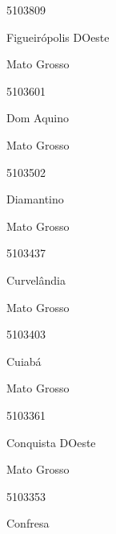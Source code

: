 \documentclass[
  letterpaper,
]{report}
\begin{document}
5103809

\n      

Figueirópolis D\textquotesingle Oeste

\n    

\n    

\n      

Mato Grosso

\n      

5103601

\n      

Dom Aquino

\n    

\n    

\n      

Mato Grosso

\n      

5103502

\n      

Diamantino

\n    

\n    

\n      

Mato Grosso

\n      

5103437

\n      

Curvelândia

\n    

\n    

\n      

Mato Grosso

\n      

5103403

\n      

Cuiabá

\n    

\n    

\n      

Mato Grosso

\n      

5103361

\n      

Conquista D\textquotesingle Oeste

\n    

\n    

\n      

Mato Grosso

\n      

5103353

\n      

Confresa

\n    
\end{document}
